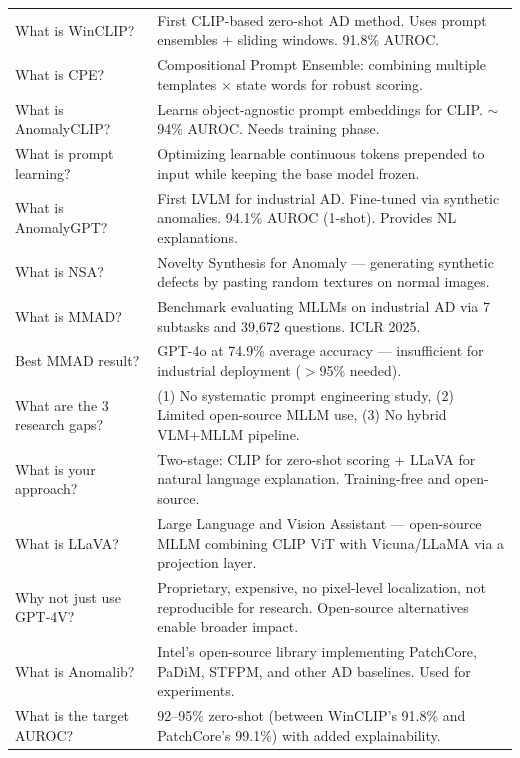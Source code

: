 \documentclass[12pt, a4paper]{article}
\begin{document}
\begin{longtable}{@{}p{5.5cm}p{9.5cm}@{}}
\addlinespace
What is WinCLIP? & First CLIP-based zero-shot AD method. Uses prompt ensembles + sliding windows. 91.8\% AUROC. \\
\addlinespace
What is CPE? & Compositional Prompt Ensemble: combining multiple templates $\times$ state words for robust scoring. \\
\addlinespace
What is AnomalyCLIP? & Learns object-agnostic prompt embeddings for CLIP. $\sim$94\% AUROC. Needs training phase. \\
\addlinespace
What is prompt learning? & Optimizing learnable continuous tokens prepended to input while keeping the base model frozen. \\
\addlinespace
What is AnomalyGPT? & First LVLM for industrial AD. Fine-tuned via synthetic anomalies. 94.1\% AUROC (1-shot). Provides NL explanations. \\
\addlinespace
What is NSA? & Novelty Synthesis for Anomaly --- generating synthetic defects by pasting random textures on normal images. \\
\addlinespace
What is MMAD? & Benchmark evaluating MLLMs on industrial AD via 7 subtasks and 39,672 questions. ICLR 2025. \\
\addlinespace
Best MMAD result? & GPT-4o at 74.9\% average accuracy --- insufficient for industrial deployment ($>$95\% needed). \\
\addlinespace
What are the 3 research gaps? & (1) No systematic prompt engineering study, (2) Limited open-source MLLM use, (3) No hybrid VLM+MLLM pipeline. \\
\addlinespace
What is your approach? & Two-stage: CLIP for zero-shot scoring + LLaVA for natural language explanation. Training-free and open-source. \\
\addlinespace
What is LLaVA? & Large Language and Vision Assistant --- open-source MLLM combining CLIP ViT with Vicuna/LLaMA via a projection layer. \\
\addlinespace
Why not just use GPT-4V? & Proprietary, expensive, no pixel-level localization, not reproducible for research. Open-source alternatives enable broader impact. \\
\addlinespace
What is Anomalib? & Intel's open-source library implementing PatchCore, PaDiM, STFPM, and other AD baselines. Used for experiments. \\
\addlinespace
What is the target AUROC? & 92--95\% zero-shot (between WinCLIP's 91.8\% and PatchCore's 99.1\%) with added explainability. \\
\bottomrule
\end{longtable}
\end{document}
